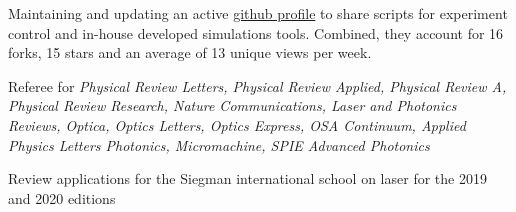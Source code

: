\documentclass[11pt, letterpaper]{customcv}
\begin{document}
%
{
    {
      \begin{cvitems} %
            \item {Maintaining and updating an active \href{https://github.com/gregmoille}{github profile}} to share scripts for experiment control and in-house developed simulations tools. Combined, they account for 16 forks, 15 stars and an average of 13 unique views per week. 
      \end{cvitems}
    }
    {
      \begin{cvitems} %
            \item {Referee for \textit{Physical Review Letters, Physical Review Applied, Physical Review A, Physical Review Research, Nature Communications, Laser and Photonics Reviews, Optica, Optics Letters, Optics Express, OSA Continuum, Applied Physics Letters Photonics, Micromachine, SPIE Advanced Photonics}}
      \end{cvitems}
    }
    {
      \begin{cvitems} %
            \item {Review applications for the Siegman international school on laser for the 2019 and 2020 editions}
      \end{cvitems}
    }
}

%
{
    \hfill%
    \hfill%
    \hfill%
     \hfill%
}
\end{document}
